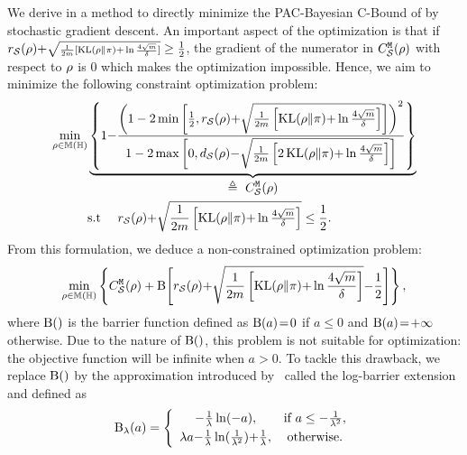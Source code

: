 We derive in  a method to directly minimize the  PAC-Bayesian C-Bound of  by stochastic gradient descent.
An important aspect of the optimization is that if $r_{\mathcal{S}}(\rho){+}{\scriptstyle\sqrt{\frac{1}{2m}[ \operatorname{KL}(\rho\|\pi){+}\ln{\scriptscriptstyle\frac{4\sqrt{m}}{\delta}}]}}\ge \frac{1}{2}$, the gradient of the numerator in ${C}^{\tt M}_{\mathcal{S}}(\rho)$ with respect to $\rho$ is 0 which makes the optimization impossible.
Hence, we aim to minimize the following constraint optimization problem:
\begin{align*}
    \min_{\Q\in\M(\H)}&\underbrace{\LC 1{-}\frac{\LP 1-2\min\LB\frac{1}{2},r_{\dS}(\Q){+}\sqrt{\frac{1}{2\m}\LB \KL(\Q\|\P){+}\ln\tfrac{4\sqrt{\m}}{\delta}\RB}\RB\RP^2}{1-2\max\LB 0, d_{\dS}(\Q){-}\sqrt{\frac{1}{2\m}\LB 2\KL(\Q\|\P){+}\ln\frac{4\sqrt{\m}}{\delta}\RB}\RB}\RC}_{\displaystyle\defeq\ \MCBound}\\
    \quad&\text{s.t }\quad r_{\dS}(\Q){+}\sqrt{\frac{1}{2\m}\LB \KL(\Q\|\P){+}\ln\tfrac{4\sqrt{\m}}{\delta}\RB}\le\frac{1}{2}.
\end{align*}
From this formulation, we deduce a non-constrained optimization problem:
\begin{align*}
\min_{\rho\in\mathbb{M}(\mathbb{H})}\left\{ {C}^{\tt M}_{\mathcal{S}}(\rho) + \operatorname{B}\!\left[ r_{\mathcal{S}}(\rho){+}\sqrt{\frac{1}{2m}\left[ \operatorname{KL}(\rho\|\pi){+}\ln\frac{4\sqrt{m}}{\delta}\right]}{-}\frac{1}{2}\right]\right\},
\end{align*}
where $\operatorname{B}()$ is the barrier function defined as $\operatorname{B}(a)\!=\!0$ if $a\!\le\! 0$ and $\operatorname{B}(a)\!=\!+\infty$ otherwise.
Due to the nature of $\operatorname{B}()$, this problem is not suitable for optimization: the objective function will be infinite when $a\!>\!0$.
To tackle this drawback, we replace $\operatorname{B}()$ by the approximation introduced by~\citet{KervadecDolzYuanDesrosiersGrangerAyed2019} called the log-barrier extension and defined as 
\begin{align*}
    \operatorname{B}_{\lambda}(a) = \left\{\begin{array}{cc}
        -\tfrac{1}{\lambda}\ln(-a), & \text{if } a \le -\tfrac{1}{\lambda^2}, \\[1mm]
        \lambda a{-}\tfrac{1}{\lambda}\ln(\tfrac{1}{\lambda^2}){+}\tfrac{1}{\lambda}, & \text{otherwise.}
    \end{array}\right.
\end{align*}

